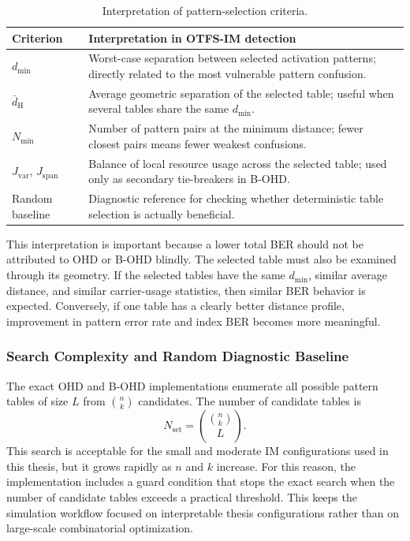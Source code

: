 \begin{table}[H]
\centering
\caption{Interpretation of pattern-selection criteria.}
\label{tab:pattern_selection_criteria_interpretation}
\begin{tabularx}{0.95\linewidth}{|p{3.2cm}|X|}
\hline
\textbf{Criterion} & \textbf{Interpretation in OTFS-IM detection} \\
\hline
\(d_{\min}\) & Worst-case separation between selected activation patterns; directly related to the most vulnerable pattern confusion. \\
\hline
\(\bar{d}_{\mathrm{H}}\) & Average geometric separation of the selected table; useful when several tables share the same \(d_{\min}\). \\
\hline
\(N_{\min}\) & Number of pattern pairs at the minimum distance; fewer closest pairs means fewer weakest confusions. \\
\hline
\(J_{\mathrm{var}}\), \(J_{\mathrm{span}}\) & Balance of local resource usage across the selected table; used only as secondary tie-breakers in B-OHD. \\
\hline
Random baseline & Diagnostic reference for checking whether deterministic table selection is actually beneficial. \\
\hline
\end{tabularx}
\end{table}

This interpretation is important because a lower total BER should not be attributed to OHD or B-OHD blindly. The selected table must also be examined through its geometry. If the selected tables have the same \(d_{\min}\), similar average distance, and similar carrier-usage statistics, then similar BER behavior is expected. Conversely, if one table has a clearly better distance profile, improvement in pattern error rate and index BER becomes more meaningful.

\subsubsection{Search Complexity and Random Diagnostic Baseline}

The exact OHD and B-OHD implementations enumerate all possible pattern tables of size \(L\) from \(\binom{n}{k}\) candidates. The number of candidate tables is
\begin{equation}
    N_{\mathrm{set}}
    =
    \binom{\binom{n}{k}}{L}.
    \label{eq:pattern_search_complexity}
\end{equation}
This search is acceptable for the small and moderate IM configurations used in this thesis, but it grows rapidly as \(n\) and \(k\) increase. For this reason, the implementation includes a guard condition that stops the exact search when the number of candidate tables exceeds a practical threshold. This keeps the simulation workflow focused on interpretable thesis configurations rather than on large-scale combinatorial optimization.

